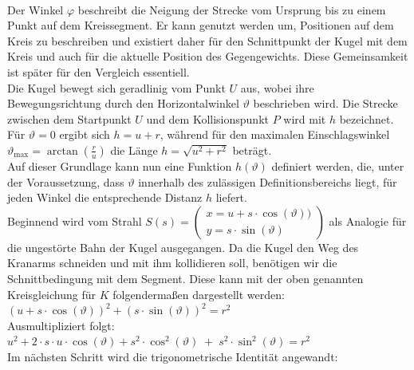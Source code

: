 \\
Der Winkel $\varphi$ beschreibt die Neigung der Strecke vom Ursprung bis zu einem Punkt auf dem Kreissegment. Er kann genutzt werden um, Positionen auf dem Kreis zu beschreiben und existiert daher für den Schnittpunkt der Kugel mit dem Kreis und auch für die aktuelle Position des Gegengewichts. Diese Gemeinsamkeit ist später für den Vergleich essentiell.
\\
Die Kugel bewegt sich geradlinig vom Punkt $U$ aus, wobei ihre Bewegungsrichtung durch den Horizontalwinkel $\vartheta$ beschrieben wird. Die Strecke zwischen dem Startpunkt $U$ und dem Kollisionspunkt $P$ wird mit $h$ bezeichnet. Für $\vartheta = 0$ ergibt sich $h = u + r$, während für den maximalen Einschlagswinkel 
$\vartheta_{\text{max}} = \arctan\!\left(\tfrac{r}{u}\right)$ 
die Länge $h = \sqrt{u^2 + r^2}$ beträgt.
\\
Auf dieser Grundlage kann nun eine Funktion $h(\vartheta)$ definiert werden, die, unter der Voraussetzung, dass $\vartheta$ innerhalb des zulässigen Definitionsbereichs liegt, für jeden Winkel die entsprechende Distanz $h$ liefert.
\\
Beginnend wird vom Strahl $S(s)=\left( \begin{smallmatrix} x = u+s\cdot \cos(\vartheta)) \\ y = s\cdot \sin(\vartheta) \end{smallmatrix} \right)$ als Analogie für die ungestörte Bahn der Kugel ausgegangen. Da die Kugel den Weg des Kranarms schneiden und mit ihm kollidieren soll, benötigen wir die Schnittbedingung mit dem Segment. Diese kann mit der oben genannten Kreisgleichung für $K$ folgendermaßen dargestellt werden: $(u+s\cdot \cos(\vartheta))^2 + (s\cdot \sin(\vartheta))^2 = r^2$
\\
Ausmultipliziert folgt:
\\
$\displaystyle 
u^2+2\cdot s\cdot u\cdot \cos(\vartheta)+s^2 \cdot \cos^2(\vartheta) \; + \; s^2\cdot \sin^2(\vartheta)=r^2$
\\
Im nächsten Schritt wird die trigonometrische Identität angewandt:

